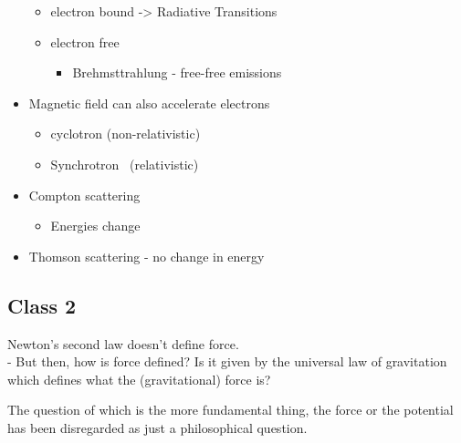 \documentclass{../template/texnote}
\begin{document}
\begin{itemize}
  \begin{itemize}
  \item
    electron bound -\textgreater{} Radiative Transitions
  \item
    electron free

    \begin{itemize}
    \tightlist
    \item
      Brehmsttrahlung - free-free emissions
    \end{itemize}
  \end{itemize}
\item
  Magnetic field can also accelerate electrons

  \begin{itemize}
  \tightlist
  \item
    cyclotron (non-relativistic)
  \item
    Synchrotron ~(relativistic)
  \end{itemize}
\item
  Compton scattering

  \begin{itemize}
  \tightlist
  \item
    Energies change
  \end{itemize}
\item
  Thomson scattering - no change in energy
\end{itemize}

\subsection{Class 2}\label{class-2}

Newton's second law doesn't define force.\\
- But then, how is force defined? Is it given by the universal law of
gravitation which defines what the (gravitational) force is?

The question of which is the more fundamental thing, the force or the
potential has been disregarded as just a philosophical question.
\end{document}
